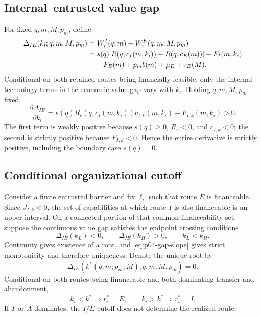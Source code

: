 \subsection{Internal--entrusted value gap}
\label{subsec:p04-value-gap}

For fixed \(q,m,M,p_m\), define
\begin{align}
  \Delta_{IE}(k_i;q,m,M,p_m)
  &=
  W_i^I(q,m)-W_i^E(q,m;M,p_m) \notag\\
  &=
  s(q)\!\left[
    R\!\left(q,c_I(m,k_i)\right)
    -R\!\left(q,c_E(m)\right)
  \right]
  -F_I(m,k_i) \notag\\
  &\quad
  +F_E(m)+p_m b(m)+\mu_E+\tau_E(M).
  \label{eq:p04-value-gap}
\end{align}
Conditional on both retained routes being financially feasible, only the
internal technology terms in the economic value gap vary with \(k_i\).
Holding \(q,m,M,p_m\) fixed,
\begin{equation}
  \frac{\partial\Delta_{IE}}{\partial k_i}
  =
  s(q)R_c\!\left(q,c_I(m,k_i)\right)c_{I,k}(m,k_i)
  -
  F_{I,k}(m,k_i)
  >0.
  \label{eq:p04-gap-slope}
\end{equation}
The first term is weakly positive because \(s(q)\geq0\),
\(R_c<0\), and \(c_{I,k}<0\); the second is strictly positive because
\(F_{I,k}<0\). Hence the entire derivative is strictly positive, including
the boundary case \(s(q)=0\).

\subsection{Conditional organizational cutoff}
\label{subsec:p04-cutoff}

Consider a finite entrusted barrier and fix \(\ell_i\) such that route \(E\)
is financeable. Since \(J_{I,k}<0\), the set of capabilities at which route
\(I\) is also financeable is an upper interval. On a connected portion of
that common-financeability set, suppose the continuous value gap satisfies the
endpoint crossing conditions
\[
  \Delta_{IE}(k_L)<0,
  \qquad
  \Delta_{IE}(k_H)>0,
  \qquad k_L<k_H.
\]
Continuity gives existence of a root, and
\eqref{eq:p04-gap-slope} gives strict monotonicity and therefore uniqueness.
Denote the unique root by
\begin{equation}
  \Delta_{IE}\!\left(k^*(q,m;p_m,M);q,m,M,p_m\right)=0.
  \label{eq:p04-cutoff}
\end{equation}
Conditional on both routes being financeable and both dominating transfer and
abandonment,
\begin{equation}
  k_i<k^*\Rightarrow r_i^*=E,
  \qquad
  k_i>k^*\Rightarrow r_i^*=I.
  \label{eq:p04-cutoff-sorting}
\end{equation}
If \(T\) or \(A\) dominates, the \(I/E\) cutoff does not determine the
realized route.

